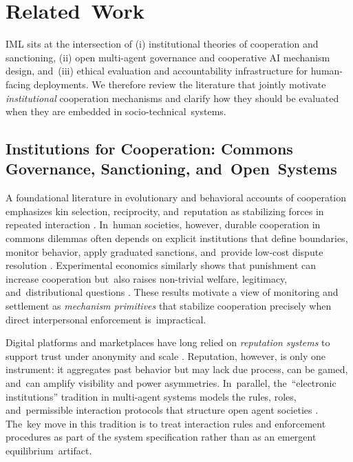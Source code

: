 \documentclass[mca,article,accept,pdftex,oneauthor]{Definitions/mdpi}
\begin{document}
\section{Related~Work}
\label{sec:related}

IML sits at the intersection of (i) institutional theories of cooperation and sanctioning, (ii) open multi-agent governance and cooperative AI mechanism design, and~(iii) ethical evaluation and accountability infrastructure for human-facing deployments. We therefore review the literature that jointly motivate \emph{institutional} cooperation mechanisms and clarify how they should be evaluated when they are embedded in socio-technical~systems.

\subsection{Institutions for Cooperation: Commons Governance, Sanctioning, and~Open~Systems}

A foundational literature in evolutionary and behavioral accounts of cooperation emphasizes kin selection, reciprocity, and~reputation as stabilizing forces in repeated interaction \citep{Hamilton1964,Trivers1971,AxelrodHamilton1981,Nowak2006}. In~human societies, however, durable cooperation in commons dilemmas often depends on explicit institutions that define boundaries, monitor behavior, apply graduated sanctions, and~provide low-cost dispute resolution \citep{Ostrom1990}. Experimental economics similarly shows that punishment can increase cooperation but~also raises non-trivial welfare, legitimacy, and~distributional questions \citep{FehrGachter2002}. These results motivate a view of monitoring and settlement as \emph{mechanism primitives} that stabilize cooperation precisely when direct interpersonal enforcement is~impractical.

Digital platforms and marketplaces have long relied on \emph{reputation systems} to support trust under anonymity and scale \citep{Resnick2000Reputation}. Reputation, however, is only one instrument: it aggregates past behavior but may lack due process, can be gamed, and~can amplify visibility and power asymmetries. In~parallel, the~``electronic institutions'' tradition in multi-agent systems models the rules, roles, and~permissible interaction protocols that structure open agent societies \citep{Esteva2000InstitutionalisingOpenMAS}. The~key move in this tradition is to treat interaction rules and enforcement procedures as part of the system specification rather than as an emergent equilibrium~artifact.
\end{document}
